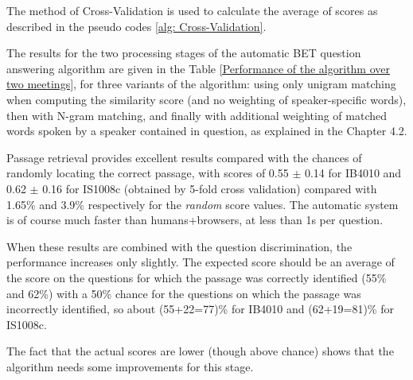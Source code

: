 %
%
%


The method of Cross-Validation is used to calculate the average of scores as described in the pseudo codes \ref{alg: Cross-Validation}.





The results for the two processing stages of the automatic BET question answering algorithm are given in the Table \ref{Performance of the algorithm over two meetings}, for three variants of the algorithm: using only unigram matching when computing the similarity score (and no weighting of speaker-specific words), then with N-gram matching, and finally with additional weighting of matched words spoken by a speaker contained in question, as explained in the Chapter 4.2.

Passage retrieval provides excellent results compared with the chances of randomly locating the correct passage, with scores of 0.55 \ensuremath{\pm} 0.14 for IB4010 and 0.62 \ensuremath{\pm} 0.16 for IS1008c (obtained by 5-fold cross validation) compared with 1.65\% and 3.9\% respectively for the \textit{random} score values. The automatic system is of course much faster than humans+browsers, at less than 1s per question.

When these results are combined with the question discrimination, the performance increases only slightly. The expected score should be an average of the score on the questions for which the passage was correctly identified (55\% and 62\%) with a 50\%  chance for the questions on which the passage was incorrectly identified, so about (55+22=77)\% for IB4010 and (62+19=81)\% for IS1008c. 

The fact that the actual scores are lower (though above chance) shows that the algorithm needs some improvements for this stage.


